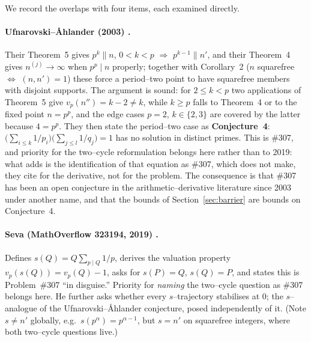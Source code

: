 \documentclass[11pt]{article}
\theoremstyle{definition}
\begin{document}
We record the overlaps with four items, each examined directly.

\paragraph{Ufnarovski--\AA hlander (2003) \cite{UfnarovskiAhlander2003}.}
Their Theorem~5 gives $p^{k}\|n$, $0<k<p$ $\Rightarrow$ $p^{k-1}\|n'$, and their Theorem~4 gives
$n^{(j)}\to\infty$ when $p^{p}\mid n$ properly; together with Corollary~2 ($n$ squarefree
$\Leftrightarrow$ $(n,n')=1$) these force a period--two point to have squarefree members with
disjoint supports. The argument is sound: for $2\le k<p$ two applications of Theorem~5 give
$v_p(n'')=k-2\ne k$, while $k\ge p$ falls to Theorem~4 or to the fixed point $n=p^p$, and the edge
cases $p=2$, $k\in\{2,3\}$ are covered by the latter because $4=p^p$. They then state the
period--two case as \textbf{Conjecture~4}: $\bigl(\sum_{i\le k}1/p_i\bigr)\bigl(\sum_{j\le l}
1/q_j\bigr)=1$ has no solution in distinct primes. This is \#307, and priority for the two--cycle
reformulation belongs here rather than to 2019: what \cite{Seva323194} adds is the identification of
that equation as \#307, which \cite{UfnarovskiAhlander2003} does not make, they cite
\cite{Barbeau1961} for the derivative, not \cite{Barbeau1976} for the problem. The consequence is
that \#307 has been an open conjecture in the arithmetic--derivative literature since 2003 under
another name, and that the bounds of Section~\ref{sec:barrier} are bounds on Conjecture~4.

\paragraph{Seva (MathOverflow 323194, 2019) \cite{Seva323194}.}
Defines $s(Q)=Q\sum_{p\mid Q}1/p$, derives the valuation property $v_p(s(Q))=v_p(Q)-1$, asks for
$s(P)=Q$, $s(Q)=P$, and states this is Problem~\#307 ``in disguise.'' Priority for \emph{naming}
the two--cycle question as \#307 belongs here. He further asks whether every $s$--trajectory stabilises at $0$; the
$s$--analogue of the Ufnarovski--\AA hlander conjecture, posed independently of it. (Note $s\ne n'$
globally, e.g.\ $s(p^\alpha)=p^{\alpha-1}$, but $s=n'$ on squarefree integers, where both two--cycle
questions live.)
\end{document}

